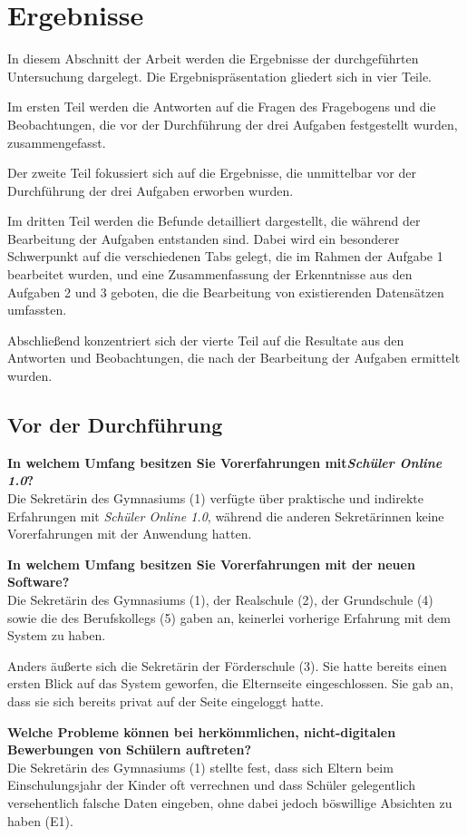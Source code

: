 \section{Ergebnisse}
In diesem Abschnitt der Arbeit werden die Ergebnisse der durchgeführten Untersuchung dargelegt. Die Ergebnispräsentation gliedert sich in vier Teile.

Im ersten Teil werden die Antworten auf die Fragen des Fragebogens und die Beobachtungen, die vor der Durchführung der drei Aufgaben festgestellt wurden, zusammengefasst.

Der zweite Teil fokussiert sich auf die Ergebnisse, die unmittelbar vor der Durchführung der drei Aufgaben erworben wurden.

Im dritten Teil werden die Befunde detailliert dargestellt, die während der Bearbeitung der Aufgaben entstanden sind. Dabei wird ein besonderer Schwerpunkt auf die verschiedenen Tabs gelegt, die im Rahmen der Aufgabe 1 bearbeitet wurden, und eine Zusammenfassung der Erkenntnisse aus den Aufgaben 2 und 3 geboten, die die Bearbeitung von existierenden Datensätzen umfassten.

Abschließend konzentriert sich der vierte Teil auf die Resultate aus den Antworten und Beobachtungen, die nach der Bearbeitung der Aufgaben ermittelt wurden.

\subsection{Vor der Durchführung}
\textbf{In welchem Umfang besitzen Sie Vorerfahrungen mit\textit{Schüler Online 1.0}?}\\
Die Sekretärin des Gymnasiums (1) verfügte über praktische und indirekte Erfahrungen mit \textit{Schüler Online 1.0}, während die anderen Sekretärinnen keine Vorerfahrungen mit der Anwendung hatten.

\textbf{In welchem Umfang besitzen Sie Vorerfahrungen mit der neuen Software?}\\
Die Sekretärin des Gymnasiums (1), der Realschule (2), der Grundschule (4) sowie die des Berufskollegs (5) gaben an, keinerlei vorherige Erfahrung mit dem System zu haben.

Anders äußerte sich die Sekretärin der Förderschule (3). Sie hatte bereits einen ersten Blick auf das System geworfen, die Elternseite eingeschlossen. Sie gab an, dass sie sich bereits privat auf der Seite eingeloggt hatte.

\textbf{Welche Probleme können bei herkömmlichen, nicht-digitalen Bewerbungen von Schülern auftreten?}\\
Die Sekretärin des Gymnasiums (1) stellte fest, dass sich Eltern beim Einschulungsjahr der Kinder oft verrechnen und dass Schüler gelegentlich versehentlich falsche Daten eingeben, ohne dabei jedoch \glqq böswillige\grqq{} Absichten zu haben (E1). 

